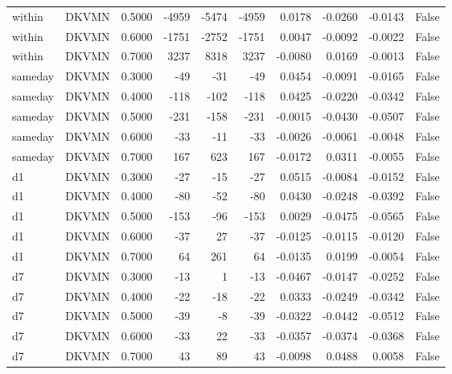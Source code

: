 \begin{tabular}{llrrrrrrrr}
within & DKVMN & 0.5000 & -4959 & -5474 & -4959 & 0.0178 & -0.0260 & -0.0143 & False \\
within & DKVMN & 0.6000 & -1751 & -2752 & -1751 & 0.0047 & -0.0092 & -0.0022 & False \\
within & DKVMN & 0.7000 & 3237 & 8318 & 3237 & -0.0080 & 0.0169 & -0.0013 & False \\
sameday & DKVMN & 0.3000 & -49 & -31 & -49 & 0.0454 & -0.0091 & -0.0165 & False \\
sameday & DKVMN & 0.4000 & -118 & -102 & -118 & 0.0425 & -0.0220 & -0.0342 & False \\
sameday & DKVMN & 0.5000 & -231 & -158 & -231 & -0.0015 & -0.0430 & -0.0507 & False \\
sameday & DKVMN & 0.6000 & -33 & -11 & -33 & -0.0026 & -0.0061 & -0.0048 & False \\
sameday & DKVMN & 0.7000 & 167 & 623 & 167 & -0.0172 & 0.0311 & -0.0055 & False \\
d1 & DKVMN & 0.3000 & -27 & -15 & -27 & 0.0515 & -0.0084 & -0.0152 & False \\
d1 & DKVMN & 0.4000 & -80 & -52 & -80 & 0.0430 & -0.0248 & -0.0392 & False \\
d1 & DKVMN & 0.5000 & -153 & -96 & -153 & 0.0029 & -0.0475 & -0.0565 & False \\
d1 & DKVMN & 0.6000 & -37 & 27 & -37 & -0.0125 & -0.0115 & -0.0120 & False \\
d1 & DKVMN & 0.7000 & 64 & 261 & 64 & -0.0135 & 0.0199 & -0.0054 & False \\
d7 & DKVMN & 0.3000 & -13 & 1 & -13 & -0.0467 & -0.0147 & -0.0252 & False \\
d7 & DKVMN & 0.4000 & -22 & -18 & -22 & 0.0333 & -0.0249 & -0.0342 & False \\
d7 & DKVMN & 0.5000 & -39 & -8 & -39 & -0.0322 & -0.0442 & -0.0512 & False \\
d7 & DKVMN & 0.6000 & -33 & 22 & -33 & -0.0357 & -0.0374 & -0.0368 & False \\
d7 & DKVMN & 0.7000 & 43 & 89 & 43 & -0.0098 & 0.0488 & 0.0058 & False \\
\bottomrule
\end{tabular}
